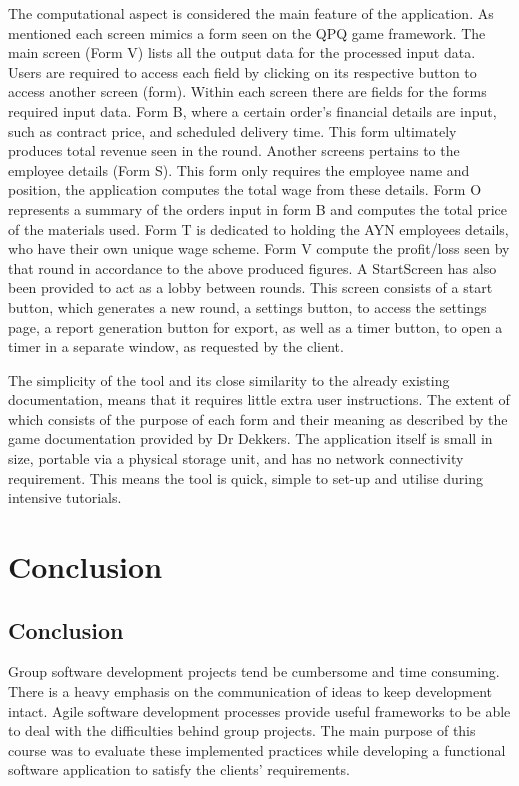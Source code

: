 \documentclass{l3proj}
\begin{document}
The computational aspect is considered the main feature of the application. As mentioned each screen mimics a form seen on the QPQ game framework. The main screen (Form V) lists all the output data for the processed input data. Users are required to access each field by clicking on its respective button to access another screen (form). Within each screen there are fields for the forms required input data. Form B, where a certain order's financial details are input, such as contract price, and scheduled delivery time. This form ultimately produces total revenue seen in the round. Another screens pertains to the employee details (Form S). This form only requires the employee name and position, the application computes the total wage from these details. Form O represents a summary of the orders input in form B and computes the total price of the materials used. Form T is dedicated to holding the AYN employees details, who have their own unique wage scheme. Form V compute the profit/loss seen by that round in accordance to the above produced figures. A StartScreen has also been provided to act as a lobby between rounds. This screen consists of a start button, which generates a new round, a settings button, to access the settings page, a report generation button for export, as well as a timer button, to open a timer in a separate window, as requested by the client.

The simplicity of the tool and its close similarity to the already existing documentation, means that it requires little extra user instructions. The extent of which consists of the purpose of each form and their meaning as described by the game documentation provided by Dr Dekkers. The application itself is small in size, portable via a physical storage unit, and has no network connectivity requirement. This means the tool is quick, simple to set-up and utilise during intensive tutorials.
\section{Conclusion}
\label{sec:conclusion}
\subsection{Conclusion}
Group software development projects tend be cumbersome and time consuming. There is a heavy emphasis on the communication of ideas to keep development intact. Agile software development processes provide useful frameworks to be able to deal with the difficulties behind group projects. The main purpose of this course was to evaluate these implemented practices while developing a functional software application to satisfy the clients' requirements.
\end{document}
